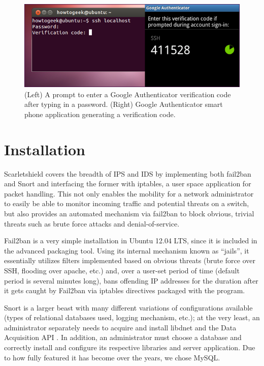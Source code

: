 \documentclass[12pt,letterpaper,titlepage]{report}
\begin{document}
{\begin{figure}[h!]
\centering
  \includegraphics{./goodleauth.png}
  \caption{(Left) A prompt to enter a Google Authenticator verification
  code after typing in a password. (Right) Google Authenticator smart phone application
  generating a verification code.}
\end{figure}

\section{Installation}

Scarletshield covers the breadth of IPS and IDS by implementing both fail2ban
and Snort and interfacing the former with iptables, a user space application for
packet handling.  This not only enables the mobility for a network administrator
to easily be able to monitor incoming traffic and potential threats on a switch,
but also provides an automated mechanism via fail2ban to block obvious, trivial
threats such as brute force attacks and denial-of-service.

Fail2ban is a very simple installation in Ubuntu 12.04 LTS, since it is included
in the advanced packaging tool.  Using its internal mechanism known as ``jails'',
it essentially utilizes filters implemented based on obvious threats (brute
force over SSH, flooding over apache, etc.) and, over a user-set period of time
(default period is several minutes long), bans offending IP addresses for the
duration after it gets caught by Fail2ban via iptables directives packaged with
the program.

Snort is a larger beast with many different variations of configurations
available (types of relational databases used, logging mechanism, etc.); at the
very least, an administrator separately needs to acquire and install libdnet and
the Data Acquisition API \autocite{snort}.  In addition, an administrator must choose a
database and correctly install and configure its respective libraries and server
application.  Due to how fully featured it has become over the years, we chose
MySQL.

}
\end{document}
